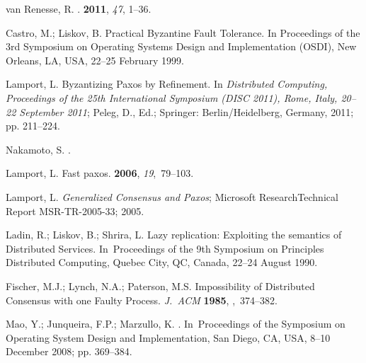 \documentclass[algorithms,article,accept,moreauthors,pdftex,10pt,a4paper]{Definitions/mdpi}
\begin{document}
\begin{thebibliography}{999}
van Renesse, R.
.
 {\bf 2011}, {\em 47}, 1--36.

Castro, M.; Liskov, B.
\newblock Practical Byzantine Fault Tolerance.
\newblock In Proceedings of the 3rd Symposium on Operating Systems Design and Implementation
(OSDI), New Orleans, LA, USA, 22--25 February 1999.

Lamport, L. Byzantizing Paxos by Refinement.
\newblock In {\em Distributed Computing, Proceedings of the 25th International Symposium (DISC
2011), Rome, Italy, 20--22 September 2011}; Peleg, D., Ed.;
Springer: Berlin/Heidelberg, Germany, 2011; pp. 211--224.

Nakamoto, S.
. %

Lamport, L.
\newblock Fast paxos.
 {\bf 2006}, {\em 19},~79--103.

Lamport, L.
\newblock \emph{Generalized Consensus and Paxos};
\newblock Microsoft ResearchTechnical Report MSR-TR-2005-33; {2005}. %

Ladin, R.; Liskov, B.; Shrira, L.
\newblock Lazy replication: Exploiting the semantics of Distributed Services.
\newblock In~Proceedings of the 9th Symposium on Principles Distributed Computing, Quebec City, QC, Canada, 22--24 August 1990.


Fischer, M.J.; Lynch, N.A.; Paterson, M.S.
\newblock Impossibility of Distributed Consensus with one Faulty Process. \emph{J.~ACM}  {\bf
1985},
,~374--382.

Mao, Y.; Junqueira, F.P.; Marzullo, K.
.
\newblock In~Proceedings of the Symposium on Operating System Design and
Implementation, San Diego, CA, USA, 8--10 December 2008; pp. 369--384.


\end{thebibliography}
\end{document}
